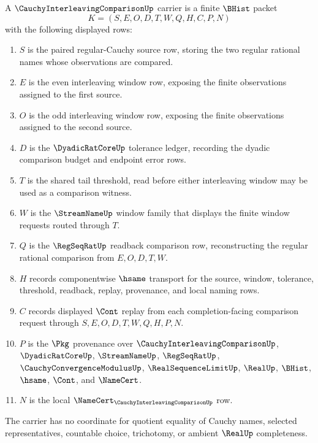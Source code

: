 \begin{definition}
\label{def:cauchy-interleaving-comparison-carrier}
A $\CauchyInterleavingComparisonUp$ carrier is a finite $\BHist$ packet
$$
K=(S,E,O,D,T,W,Q,H,C,P,N)
$$
with the following displayed rows:
\begin{enumerate}
\item $S$ is the paired regular-Cauchy source row, storing the two regular rational names whose observations are compared.
\item $E$ is the even interleaving window row, exposing the finite observations assigned to the first source.
\item $O$ is the odd interleaving window row, exposing the finite observations assigned to the second source.
\item $D$ is the $\DyadicRatCoreUp$ tolerance ledger, recording the dyadic comparison budget and endpoint error rows.
\item $T$ is the shared tail threshold, read before either interleaving window may be used as a comparison witness.
\item $W$ is the $\StreamNameUp$ window family that displays the finite window requests routed through $T$.
\item $Q$ is the $\RegSeqRatUp$ readback comparison row, reconstructing the regular rational comparison from $E,O,D,T,W$.
\item $H$ records componentwise $\hsame$ transport for the source, window, tolerance, threshold, readback, replay, provenance, and local naming rows.
\item $C$ records displayed $\Cont$ replay from each completion-facing comparison request through $S,E,O,D,T,W,Q,H,P,N$.
\item $P$ is the $\Pkg$ provenance over $\CauchyInterleavingComparisonUp$, $\DyadicRatCoreUp$, $\StreamNameUp$, $\RegSeqRatUp$, $\CauchyConvergenceModulusUp$, $\RealSequenceLimitUp$, $\RealUp$, $\BHist$, $\hsame$, $\Cont$, and $\NameCert$.
\item $N$ is the local $\NameCert_{\CauchyInterleavingComparisonUp}$ row.
\end{enumerate}
The carrier has no coordinate for quotient equality of Cauchy names, selected representatives, countable choice, trichotomy, or ambient $\RealUp$ completeness.
\end{definition}

